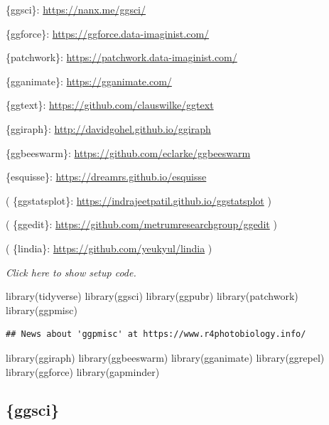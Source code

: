 \documentclass[]{book}
\newenvironment{Shaded}{}{}
\newcommand{\KeywordTok}[1]{\textcolor[rgb]{0.00,0.00,1.00}{#1}}
\newcommand{\NormalTok}[1]{#1}
\begin{document}
\{ggsci\}: \url{https://nanx.me/ggsci/}

\{ggforce\}: \url{https://ggforce.data-imaginist.com/}

\{patchwork\}: \url{https://patchwork.data-imaginist.com/}

\{gganimate\}: \url{https://gganimate.com/}

\{ggtext\}: \url{https://github.com/clauswilke/ggtext}

\{ggiraph\}: \url{http://davidgohel.github.io/ggiraph}

\{ggbeeswarm\}: \url{https://github.com/eclarke/ggbeeswarm}

\{esquisse\}: \url{https://dreamrs.github.io/esquisse}

( \{ggstatsplot\}: \url{https://indrajeetpatil.github.io/ggstatsplot} )

( \{ggedit\}: \url{https://github.com/metrumresearchgroup/ggedit} )

( \{lindia\}: \url{https://github.com/yeukyul/lindia} )

\emph{Click here to show setup code.}

\begin{Shaded}
\begin{Highlighting}[]
\KeywordTok{library}\NormalTok{(tidyverse)}
\KeywordTok{library}\NormalTok{(ggsci)}
\KeywordTok{library}\NormalTok{(ggpubr)}
\KeywordTok{library}\NormalTok{(patchwork)}
\KeywordTok{library}\NormalTok{(ggpmisc)}
\end{Highlighting}
\end{Shaded}

\begin{verbatim}
## News about 'ggpmisc' at https://www.r4photobiology.info/
\end{verbatim}

\begin{Shaded}
\begin{Highlighting}[]
\KeywordTok{library}\NormalTok{(ggiraph)}
\KeywordTok{library}\NormalTok{(ggbeeswarm)}
\KeywordTok{library}\NormalTok{(gganimate)}
\KeywordTok{library}\NormalTok{(ggrepel)}
\KeywordTok{library}\NormalTok{(ggforce)}
\KeywordTok{library}\NormalTok{(gapminder)}
\end{Highlighting}
\end{Shaded}

\hypertarget{ggsci}{%
\subsection{\{ggsci\}}\label{ggsci}}
\end{document}
